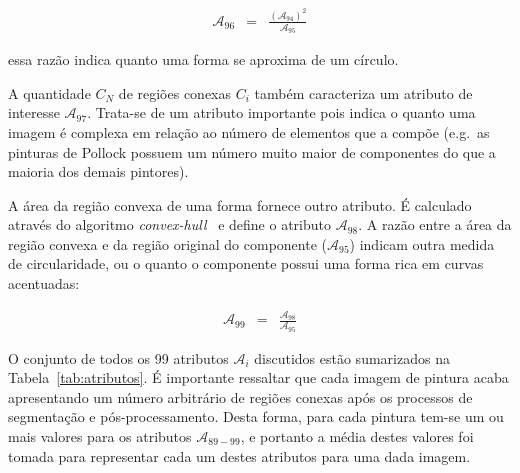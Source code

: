 \begin{eqnarray}
  \mathcal{A}_{96} & = & \frac{(\mathcal{A}_{94})^2}{\mathcal{A}_{95}}
\end{eqnarray}

\noindent essa razão indica quanto uma forma se aproxima de um círculo.

A quantidade $C_N$ de regiões conexas $C_i$ também caracteriza um atributo de
interesse $\mathcal{A}_{97}$. Trata-se de um atributo importante pois indica o
quanto uma imagem é complexa em relação ao número de elementos que a compõe
(e.g.\ as pinturas de Pollock possuem um número muito maior de componentes do
que a maioria dos demais pintores).

A área da região convexa de uma forma fornece outro atributo. É calculado
através do algoritmo \textit{convex-hull}~\cite{luciano} e define o atributo
$\mathcal{A}_{98}$. A razão entre a área da região convexa e da região original
do componente ($\mathcal{A}_{95}$) indicam outra medida de circularidade, ou o
quanto o componente possui uma forma rica em curvas acentuadas:

\begin{eqnarray}
  \mathcal{A}_{99} & = & \frac{\mathcal{A}_{98}}{\mathcal{A}_{95}}
\end{eqnarray}

O conjunto de todos os 99 atributos $\mathcal{A}_i$ discutidos estão sumarizados na
Tabela~\ref{tab:atributos}. É importante ressaltar que cada imagem de pintura
acaba apresentando um número arbitrário de regiões conexas após os processos de
segmentação e pós-processamento. Desta forma, para cada pintura tem-se um ou
mais valores para os atributos $\mathcal{A}_{89-99}$, e portanto a média destes
valores foi tomada para representar cada um destes atributos para uma dada imagem.


